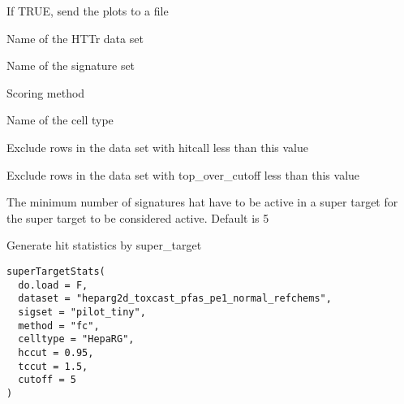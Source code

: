 \documentclass[letterpaper]{book}
\begin{document}
%
\begin{Arguments}
\begin{ldescription}
\item[\code{to.file}] If TRUE, send the plots to a file

\item[\code{dataset}] Name of the HTTr data set

\item[\code{sigset}] Name of the signature set

\item[\code{method}] Scoring method

\item[\code{celltype}] Name of the cell type

\item[\code{hccut}] Exclude rows in the data set with hitcall less than this value

\item[\code{tccut}] Exclude rows in the data set with top\_over\_cutoff less than this value

\item[\code{cutoff}] The minimum number of signatures hat have to be active in a super
target for the super target to be considered active. Default is 5
\end{ldescription}
\end{Arguments}
%
\begin{Description}\relax
Generate hit statistics by super\_target
\end{Description}
%
\begin{Usage}
\begin{verbatim}
superTargetStats(
  do.load = F,
  dataset = "heparg2d_toxcast_pfas_pe1_normal_refchems",
  sigset = "pilot_tiny",
  method = "fc",
  celltype = "HepaRG",
  hccut = 0.95,
  tccut = 1.5,
  cutoff = 5
)
\end{verbatim}
\end{Usage}
%
\end{document}

